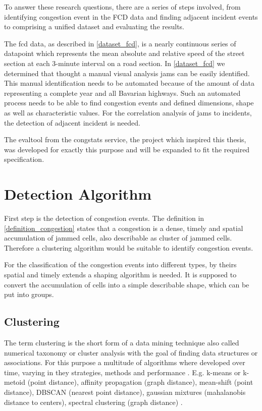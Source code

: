 \documentclass[a4paper,12pt]{report}
\begin{document}
To answer these research questions, there are a series of steps involved, from identifying congestion event in the FCD data and finding adjacent incident events to comprising a unified dataset and evaluating the results.

\bigskip

The \acrshort{fcd} data, as described in \ref{dataset_fcd}, is a nearly continuous series of datapoint which represents the mean absolute and relative speed of the street section at each 3-minute interval on a road section. In \ref{dataset_fcd} we determined that thought a manual visual analysis jams can be easily identified. This manual identification needs to be automated because of the amount of data representing a complete year and all Bavarian highways. Such an automated process needs to be able to find congestion events and defined dimensions, shape as well as characteristic values. For the correlation analysis of jams to incidents, the detection of adjacent incident is needed.

The \gls{evaltool} from the \gls{congstats} service, the project which inspired this thesis, was developed for exactly this purpose and will be expanded to fit the required specification.

\section{Detection Algorithm}
First step is the detection of congestion events. The definition in \ref{definition_congestion} states that a congestion is a dense, timely and spatial accumulation of jammed cells, also describable as cluster of jammed cells. Therefore a clustering algorithm would be suitable to identify congestion events.

For the classification of the congestion events into different types, by theirs spatial and timely extends a shaping algorithm is needed. It is supposed to convert the accumulation of cells into a simple describable shape, which can be put into groups.

\subsection{Clustering}
The term clustering is the short form of a data mining technique also called numerical taxonomy or cluster analysis with the goal of finding data structures or associations. For this purpose a multitude of algorithms where developed over time, varying in they strategies, methods and performance \cite{Busch2004}. E.g. k-means or k-metoid (point distance), affinity propagation (graph distance), mean-shift (point distance), DBSCAN (nearest point distance), gaussian mixtures (mahalanobis distance to centers), spectral clustering (graph distance) \cite{Chauhan2020}.
\end{document}
